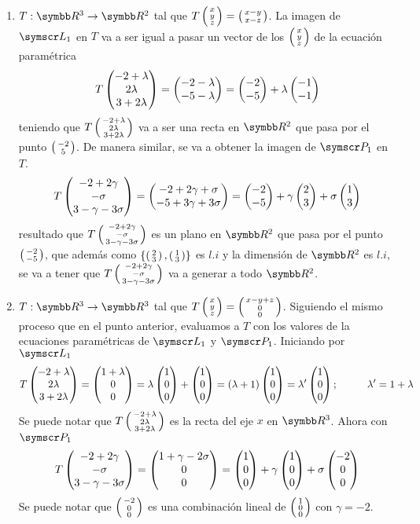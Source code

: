     \begin{enumerate}[label=\listAlph]
        \item \(T: \realR^3 \rightarrow \realR^2\) tal que \(T\fsmvec{x,y,z}=\fsmvec{x-y,x-z}\).
            La imagen de \(\fl_1\) en \(T\) va a ser igual a pasar un vector de los \(\fsmvec{x,y,z}\) de la ecuación paramétrica
            \[
                T\fvec{-2 + \lambda, 2\lambda, 3 + 2\lambda}
                = \fvec{-2 -\lambda,-5 - \lambda}
                = \fvec{-2,-5} + \lambda\fvec{-1,-1}
            \]
            teniendo que \(T\fsmvec{-2 + \lambda, 2\lambda, 3 + 2\lambda}\) va a ser una recta en \(\realR^2\) que pasa por el punto \(\fsmvec{-2,5}\).
            De manera similar, se va a obtener la imagen de \(\fp_1\) en \(T\).
            \[
                T\fvec{-2 + 2\gamma, -\sigma, 3 -\gamma -3\sigma}
                = \fvec{-2 + 2\gamma + \sigma, -5 + 3\gamma + 3\sigma}
                = \fvec{-2,-5} + \gamma\fvec{2,3} + \sigma\fvec{1,3}
            \]
            resultado que \(T\fsmvec{-2 + 2\gamma, -\sigma, 3 -\gamma -3\sigma}\) es un plano en \(\realR^2\) que pasa por el punto \(\fsmvec{-2,-5}\), que 
            además como \(\fset{\fsmvec{2,3}, \fsmvec{1,3}}\) es \(l.i\) y la dimensión de \(\realR^2\) es \(l.i\), se va a tener que 
            \(T\fsmvec{-2 + 2\gamma, -\sigma, 3 -\gamma -3\sigma}\) va a generar a todo \(\realR^2\).
        \item \(T: \realR^3 \rightarrow \realR^3\) tal que \(T\fsmvec{x,y,z}=\fsmvec{x-y+z,0,0}\).
            Siguiendo el mismo proceso que en el punto anterior, evaluamos a \(T\) con los valores de la ecuaciones paramétricas de \(\fl_1\) y \(\fp_1\).
            Iniciando por \(\fl_1\)
            \[
                T\fvec{-2 + \lambda, 2\lambda, 3 + 2\lambda}
                = \fvec{1 + \lambda,0,0}
                = \lambda\fvec{1,0,0} + \fvec{1,0,0}
                = \left(\lambda + 1\right)\fvec{1,0,0}
                = \lambda' \fvec{1,0,0};
                \hspace{1cm}
                \lambda' = 1 + \lambda
            \]
            Se puede notar que \(T\fsmvec{-2 + \lambda, 2\lambda, 3 + 2\lambda}\) es la recta del eje \(x\) en \(\realR^3\).
            Ahora con \(\fp_1\)
            \[
                T\fvec{-2 + 2\gamma, -\sigma, 3 -\gamma -3\sigma}
                = \fvec{1 + \gamma - 2\sigma,0,0}
                = \fvec{1,0,0} + \gamma \fvec{1,0,0} + \sigma \fvec{-2,0,0}
            \]
            Se puede notar que \(\fsmvec{-2,0,0}\) es una combinación lineal de \(\fsmvec{1,0,0}\) con \(\gamma = -2\).

\end{enumerate}
